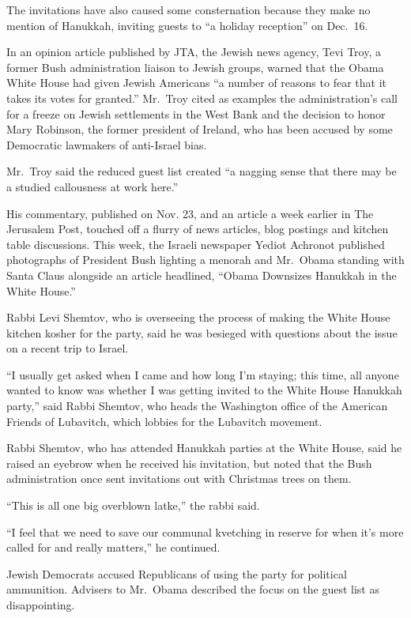 ﻿\documentclass[12pt]{article}
\begin{document}
The invitations have also caused some consternation because they make no mention of Hanukkah,
inviting guests to ``a holiday reception'' on Dec.~16.

In an opinion article published by JTA, the Jewish news agency, Tevi Troy, a former Bush
administration liaison to Jewish groups, warned that the Obama White House had given Jewish
Americans ``a number of reasons to fear that it takes its votes for granted.'' Mr.~Troy cited as
examples the administration's call for a freeze on Jewish settlements in the West Bank and the
decision to honor Mary Robinson, the former president of Ireland, who has been accused by some
Democratic lawmakers of anti-Israel bias.

Mr.~Troy said the reduced guest list created ``a nagging sense that there may be a studied
callousness at work here.''

His commentary, published on Nov. 23, and an article a week earlier in The Jerusalem Post, touched
off a flurry of news articles, blog postings and kitchen table discussions. This week, the Israeli
newspaper Yediot Achronot published photographs of President Bush lighting a menorah and Mr.~Obama
standing with Santa Claus alongside an article headlined, ``Obama Downsizes Hanukkah in the White
House.''

Rabbi Levi Shemtov, who is overseeing the process of making the White House kitchen kosher for the
party, said he was besieged with questions about the issue on a recent trip to Israel.

``I usually get asked when I came and how long I'm staying; this time, all anyone wanted to know was
whether I was getting invited to the White House Hanukkah party,'' said Rabbi Shemtov, who heads the
Washington office of the American Friends of Lubavitch, which lobbies for the Lubavitch movement.

Rabbi Shemtov, who has attended Hanukkah parties at the White House, said he raised an eyebrow when
he received his invitation, but noted that the Bush administration once sent invitations out with
Christmas trees on them.

``This is all one big overblown latke,'' the rabbi said.

``I feel that we need to save our communal kvetching in reserve for when it's more called for and
really matters,'' he continued.

Jewish Democrats accused Republicans of using the party for political ammunition. Advisers to
Mr.~Obama described the focus on the guest list as disappointing.
\end{document}
